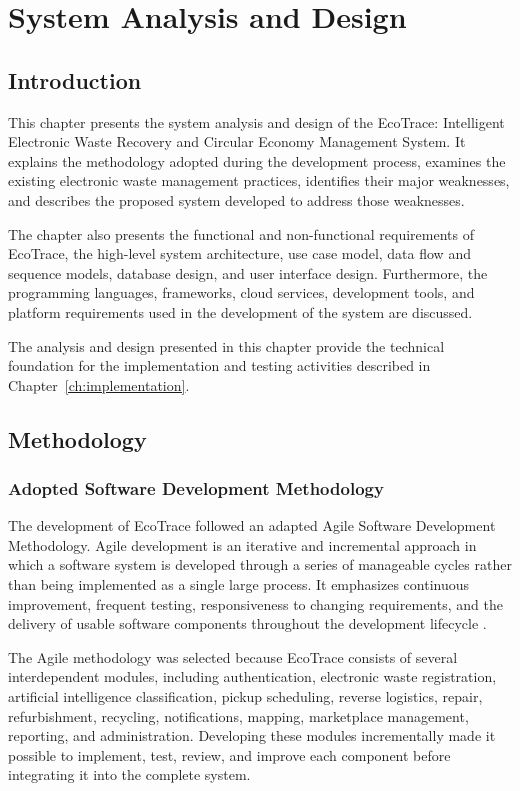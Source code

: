 \chapter{System Analysis and Design}
\label{ch:analysis-design}

\section{Introduction}

This chapter presents the system analysis and design of the EcoTrace: Intelligent
Electronic Waste Recovery and Circular Economy Management System. It
explains the methodology adopted during the development process, examines the
existing electronic waste management practices, identifies their major
weaknesses, and describes the proposed system developed to address those
weaknesses.

The chapter also presents the functional and non-functional requirements of
EcoTrace, the high-level system architecture, use case model, data flow and
sequence models, database design, and user interface design. Furthermore, the
programming languages, frameworks, cloud services, development tools, and
platform requirements used in the development of the system are discussed.

The analysis and design presented in this chapter provide the technical
foundation for the implementation and testing activities described in
Chapter~\ref{ch:implementation}.

\section{Methodology}

\subsection{Adopted Software Development Methodology}

The development of EcoTrace followed an adapted Agile Software Development
Methodology. Agile development is an iterative and incremental approach in
which a software system is developed through a series of manageable cycles
rather than being implemented as a single large process. It emphasizes continuous
improvement, frequent testing, responsiveness to changing requirements, and the
delivery of usable software components throughout the development lifecycle
\citep{agile2001,sommerville2016}.

The Agile methodology was selected because EcoTrace consists of several
interdependent modules, including authentication, electronic waste registration,
artificial intelligence classification, pickup scheduling, reverse logistics, repair,
refurbishment, recycling, notifications, mapping, marketplace management,
reporting, and administration. Developing these modules incrementally made it
possible to implement, test, review, and improve each component before
integrating it into the complete system.

